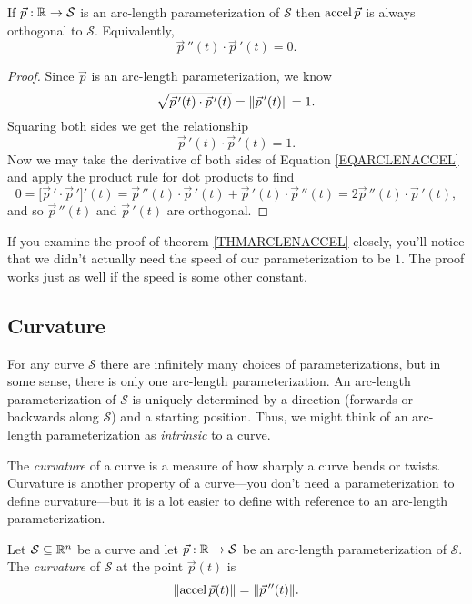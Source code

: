 \begin{theorem}
	\label{THMARCLENACCEL}
	If $\vec p:\mathbb{R}\to\mathcal S$ is an arc-length parameterization of $\mathcal S$ then
	$\operatorname{accel}\vec p$ is always orthogonal to $\mathcal S$.  Equivalently,
	\[
		\vec p\,''(t)\cdot \vec p\,'(t)=0.
	\]
\end{theorem}
\begin{proof}
	Since $\vec p$ is an arc-length parameterization, we know 
	\[
		\sqrt{\vec p\,'(t)\cdot \vec p\,'(t)} = \lVert\vec p\,'(t)\rVert=1.
	\]
	Squaring both sides we get the relationship
	\begin{equation}
		\label{EQARCLENACCEL}
		\vec p\,'(t)\cdot \vec p\,'(t)=1.
	\end{equation}
	Now we may take the derivative of both sides of Equation \eqref{EQARCLENACCEL} and apply the
	product rule for dot products to find
	\[
		0=\big[\vec p\,'\cdot \vec p\,'\big]'(t) = \vec p\,''(t)\cdot \vec p\,'(t)+
		\vec p\,'(t)\cdot \vec p\,''(t) = 2\vec p\,''(t)\cdot \vec p\,'(t),
	\]
	and so $\vec p\,''(t)$ and $\vec p\,'(t)$ are orthogonal.
\end{proof}

If you examine the proof of theorem \ref{THMARCLENACCEL} closely, you'll notice that we didn't
actually need the speed of our parameterization to be $1$.  The proof works just as well if
the speed is some other constant.

\subsection{Curvature}
For any curve $\mathcal S$ there are infinitely many choices of parameterizations, but in some
sense, there is only one arc-length parameterization.  An arc-length parameterization of
$\mathcal S$ is uniquely determined by a direction (forwards or backwards along $\mathcal S$)
and a starting position.  Thus, we might think of an arc-length parameterization as 
\emph{intrinsic} to a curve.

The \emph{curvature} of a curve is a measure of how sharply a curve bends or
twists.  Curvature is another property of a curve---you don't need a parameterization to define
curvature---but it is a lot easier to define with reference to an arc-length parameterization.

\begin{definition}[Curvature]
	Let $\mathcal S\subseteq\mathbb{R}^n$ be a curve and let $\vec p:\mathbb{R}\to\mathcal S$ be an arc-length
	parameterization of $\mathcal S$.  The \emph{curvature} of $\mathcal S$ at the point
	$\vec p(t)$ is 
	\[
		\lVert\operatorname{accel} \vec p(t)\rVert = \lVert\vec p\,''(t)\rVert.
	\]
\end{definition}

